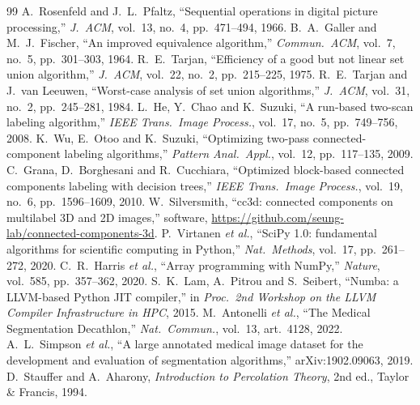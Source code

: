\documentclass[11pt,a4paper]{article}
\begin{document}
{}
\begin{thebibliography}{99}\small
\setlength{\itemsep}{1pt}\setlength{\parskip}{0pt}
 A.~Rosenfeld and J.~L.~Pfaltz, ``Sequential operations in digital picture processing,'' \emph{J.\ ACM}, vol.~13, no.~4, pp.~471--494, 1966.
 B.~A.~Galler and M.~J.~Fischer, ``An improved equivalence algorithm,'' \emph{Commun.\ ACM}, vol.~7, no.~5, pp.~301--303, 1964.
 R.~E.~Tarjan, ``Efficiency of a good but not linear set union algorithm,'' \emph{J.\ ACM}, vol.~22, no.~2, pp.~215--225, 1975.
 R.~E.~Tarjan and J.~van Leeuwen, ``Worst-case analysis of set union algorithms,'' \emph{J.\ ACM}, vol.~31, no.~2, pp.~245--281, 1984.
 L.~He, Y.~Chao and K.~Suzuki, ``A run-based two-scan labeling algorithm,'' \emph{IEEE Trans.\ Image Process.}, vol.~17, no.~5, pp.~749--756, 2008.
 K.~Wu, E.~Otoo and K.~Suzuki, ``Optimizing two-pass connected-component labeling algorithms,'' \emph{Pattern Anal.\ Appl.}, vol.~12, pp.~117--135, 2009.
 C.~Grana, D.~Borghesani and R.~Cucchiara, ``Optimized block-based connected components labeling with decision trees,'' \emph{IEEE Trans.\ Image Process.}, vol.~19, no.~6, pp.~1596--1609, 2010.
 W.~Silversmith, ``cc3d: connected components on multilabel 3D and 2D images,'' software, \url{https://github.com/seung-lab/connected-components-3d}.
 P.~Virtanen \emph{et al.}, ``SciPy 1.0: fundamental algorithms for scientific computing in Python,'' \emph{Nat.\ Methods}, vol.~17, pp.~261--272, 2020.
 C.~R.~Harris \emph{et al.}, ``Array programming with NumPy,'' \emph{Nature}, vol.~585, pp.~357--362, 2020.
 S.~K.~Lam, A.~Pitrou and S.~Seibert, ``Numba: a LLVM-based Python JIT compiler,'' in \emph{Proc.\ 2nd Workshop on the LLVM Compiler Infrastructure in HPC}, 2015.
 M.~Antonelli \emph{et al.}, ``The Medical Segmentation Decathlon,'' \emph{Nat.\ Commun.}, vol.~13, art.~4128, 2022.
 A.~L.~Simpson \emph{et al.}, ``A large annotated medical image dataset for the development and evaluation of segmentation algorithms,'' arXiv:1902.09063, 2019.
 D.~Stauffer and A.~Aharony, \emph{Introduction to Percolation Theory}, 2nd ed., Taylor \& Francis, 1994.
\end{thebibliography}
\end{document}
